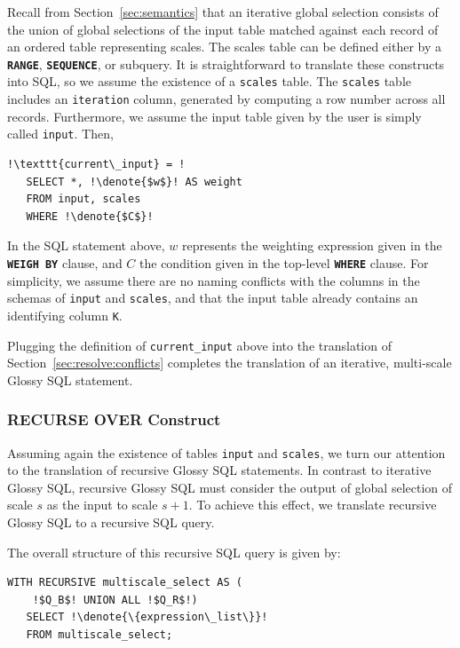 \documentclass[11pt, oneside]{report}
\newcommand{\denote}[1]{\text{$[\![ $#1$ ]\!]$}}
\begin{document}
Recall from Section~\ref{sec:semantics} that an iterative global selection consists of the union of global selections of the input table matched against each record of an ordered table representing scales. The scales table can be defined either by a \textbf{\texttt{RANGE}}, \textbf{\texttt{SEQUENCE}}, or subquery. It is straightforward to translate these constructs into SQL, so we assume the existence of a \texttt{scales} table. The \texttt{scales} table includes an \texttt{iteration} column, generated by computing a row number across all records. Furthermore, we assume the input table given by the user is simply called \texttt{input}. Then,

\begin{lstlisting}[escapechar=!]
  !\texttt{current\_input} = !
   SELECT *, !\denote{$w$}! AS weight
   FROM input, scales
   WHERE !\denote{$C$}!   
\end{lstlisting}

In the SQL statement above, $w$ represents the weighting expression given in the \textbf{\texttt{WEIGH BY}} clause, and $C$ the condition given in the top-level \textbf{\texttt{WHERE}} clause. For simplicity, we assume there are no naming conflicts with the columns in the schemas of \texttt{input} and \texttt{scales}, and that the input table already contains an identifying column \texttt{K}. 

Plugging the definition of \texttt{current\_input} above into the translation of Section~\ref{sec:resolve:conflicts} completes the translation of an iterative, multi-scale Glossy SQL statement. 

\subsubsection{RECURSE OVER Construct}
\label{sec:translation:recursive}

Assuming again the existence of tables \texttt{input} and \texttt{scales}, we turn our attention to the translation of recursive Glossy SQL statements. In contrast to iterative Glossy SQL, recursive Glossy SQL must consider the output of global selection of scale $s$ as the input to scale $s+1$. To achieve this effect, we translate recursive Glossy SQL to a recursive SQL query.

The overall structure of this recursive SQL query is given by:

\begin{lstlisting}[escapechar=!]
   WITH RECURSIVE multiscale_select AS (
    !$Q_B$! UNION ALL !$Q_R$!)
   SELECT !\denote{\{expression\_list\}}! 
   FROM multiscale_select;
\end{lstlisting}  
\end{document}
